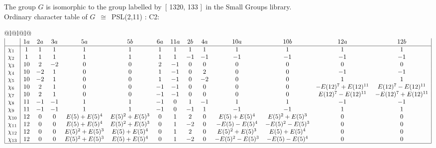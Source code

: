 \documentclass[varwidth=\maxdimen,border=10]{standalone}
\begin{document}
The group $G$ is isomorphic to the group labelled by\ [ 1320, 133 ]\ in the Small Groups library.\\
Ordinary character table of $G$\ $\cong$\ PSL(2,11) : C2:\\
\begin{center}
\begin{tabular}{@{}l@{}l@{}l@{}}
\hline
\(\begin{array}{|l|ccccccccccccc|}
  & 1a & 2a & 3a & 5a & 5b & 6a & 11a & 2b & 4a & 10a & 10b & 12a & 12b\\ \hline
\chi_{1} & 1 & 1 & 1 & 1 & 1 & 1 & 1 & 1 & 1 & 1 & 1 & 1 & 1\\
\chi_{2} & 1 & 1 & 1 & 1 & 1 & 1 & 1 & -1 & -1 & -1 & -1 & -1 & -1\\
\chi_{3} & 10 & 2 & -2 & 0 & 0 & 2 & -1 & 0 & 0 & 0 & 0 & 0 & 0\\
\chi_{4} & 10 & -2 & 1 & 0 & 0 & 1 & -1 & 0 & 2 & 0 & 0 & -1 & -1\\
\chi_{5} & 10 & -2 & 1 & 0 & 0 & 1 & -1 & 0 & -2 & 0 & 0 & 1 & 1\\
\chi_{6} & 10 & 2 & 1 & 0 & 0 & -1 & -1 & 0 & 0 & 0 & 0 & -E(12)^{7}+E(12)^{11} & E(12)^{7}-E(12)^{11}\\
\chi_{7} & 10 & 2 & 1 & 0 & 0 & -1 & -1 & 0 & 0 & 0 & 0 & E(12)^{7}-E(12)^{11} & -E(12)^{7}+E(12)^{11}\\
\chi_{8} & 11 & -1 & -1 & 1 & 1 & -1 & 0 & 1 & -1 & 1 & 1 & -1 & -1\\
\chi_{9} & 11 & -1 & -1 & 1 & 1 & -1 & 0 & -1 & 1 & -1 & -1 & 1 & 1\\
\chi_{10} & 12 & 0 & 0 & E(5)+E(5)^{4} & E(5)^{2}+E(5)^{3} & 0 & 1 & 2 & 0 & E(5)+E(5)^{4} & E(5)^{2}+E(5)^{3} & 0 & 0\\
\chi_{11} & 12 & 0 & 0 & E(5)+E(5)^{4} & E(5)^{2}+E(5)^{3} & 0 & 1 & -2 & 0 & -E(5)-E(5)^{4} & -E(5)^{2}-E(5)^{3} & 0 & 0\\
\chi_{12} & 12 & 0 & 0 & E(5)^{2}+E(5)^{3} & E(5)+E(5)^{4} & 0 & 1 & 2 & 0 & E(5)^{2}+E(5)^{3} & E(5)+E(5)^{4} & 0 & 0\\
\chi_{13} & 12 & 0 & 0 & E(5)^{2}+E(5)^{3} & E(5)+E(5)^{4} & 0 & 1 & -2 & 0 & -E(5)^{2}-E(5)^{3} & -E(5)-E(5)^{4} & 0 & 0\\
\hline
\end{array}\)\\
\end{tabular}
\end{center}
\end{document}
